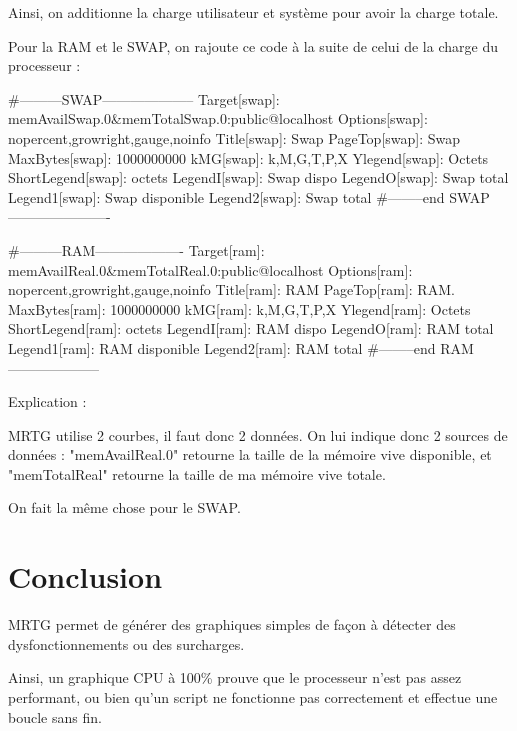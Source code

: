 Ainsi, on additionne la charge utilisateur et système pour avoir la charge totale.

Pour la RAM et le SWAP, on rajoute ce code à la suite de celui de la charge du processeur :

#---------SWAP--------------------
Target[swap]: memAvailSwap.0&memTotalSwap.0:public@localhost
Options[swap]: nopercent,growright,gauge,noinfo
Title[swap]: Swap
PageTop[swap]: Swap
MaxBytes[swap]: 1000000000
kMG[swap]: k,M,G,T,P,X
Ylegend[swap]: Octets
ShortLegend[swap]: octets
LegendI[swap]: Swap dispo
LegendO[swap]: Swap total
Legend1[swap]: Swap disponible
Legend2[swap]: Swap total
#--------end SWAP----------------------


#---------RAM-------------------
Target[ram]: memAvailReal.0&memTotalReal.0:public@localhost
Options[ram]: nopercent,growright,gauge,noinfo
Title[ram]: RAM
PageTop[ram]: RAM.
MaxBytes[ram]: 1000000000
kMG[ram]: k,M,G,T,P,X
Ylegend[ram]: Octets
ShortLegend[ram]: octets
LegendI[ram]: RAM dispo
LegendO[ram]: RAM total
Legend1[ram]: RAM disponible
Legend2[ram]: RAM total
#--------end RAM--------------------


Explication :

MRTG utilise 2 courbes, il faut donc 2 données. On lui indique donc 2 sources de données : "memAvailReal.0" retourne la taille de la mémoire vive disponible, et "memTotalReal" retourne la taille de ma mémoire vive totale.

On fait la même chose pour le SWAP.

\section{Conclusion}

MRTG permet de générer des graphiques simples de façon à détecter des dysfonctionnements ou des surcharges.

Ainsi, un graphique CPU à 100\% prouve que le processeur n'est pas assez performant, ou bien qu'un script ne fonctionne pas correctement et effectue une boucle sans fin.


